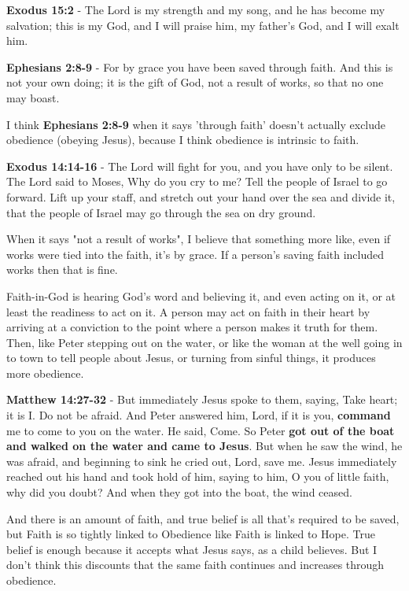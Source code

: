 \documentclass[11pt]{article}
\begin{document}
\textbf{Exodus 15:2} - The Lord is my strength and my song, and he has become my salvation; this is my God, and I will praise him, my father's God, and I will exalt him.

\textbf{Ephesians 2:8-9} - For by grace you have been saved through faith. And this is not your own doing; it is the gift of God, not a result of works, so that no one may boast.

I think \textbf{Ephesians 2:8-9} when it says 'through faith' doesn't actually exclude obedience (obeying Jesus), because I think obedience is intrinsic to faith.

\textbf{Exodus 14:14-16} - The Lord will fight for you, and you have only to be silent.  The Lord said to Moses, Why do you cry to me? Tell the people of Israel to go forward.  Lift up your staff, and stretch out your hand over the sea and divide it, that the people of Israel may go through the sea on dry ground.

When it says "not a result of works", I believe that something more like, even if works were tied into the faith, it's by grace. If a person's saving faith included works then that is fine.

Faith-in-God is hearing God's word and believing it, and even acting on it, or at least the readiness to act on it.
A person may act on faith in their heart by arriving at a conviction to the point where a person makes it truth for them.
Then, like Peter stepping out on the water, or like the woman at the well going in to town to tell people about Jesus, or turning from sinful things, it produces more obedience.

\textbf{Matthew 14:27-32} - But immediately Jesus spoke to them, saying, Take heart; it is I. Do not be afraid. And Peter answered him, Lord, if it is you, \textbf{command} me to come to you on the water. He said, Come. So Peter \textbf{got out of the boat and walked on the water and came to Jesus}. But when he saw the wind, he was afraid, and beginning to sink he cried out, Lord, save me. Jesus immediately reached out his hand and took hold of him, saying to him, O you of little faith, why did you doubt? And when they got into the boat, the wind ceased.

And there is an amount of faith, and true belief is all that's required to be saved, but Faith is so tightly linked to Obedience like Faith is linked to Hope. True belief is enough because it accepts what Jesus says, as a child believes. But I don't think this discounts that the same faith continues and increases through obedience.
\end{document}
